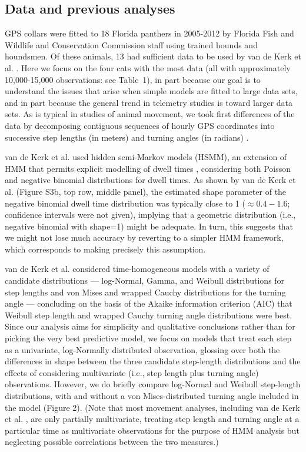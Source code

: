 \documentclass{bmcart}
\begin{document}
\subsection*{Data and previous analyses}


GPS collars were fitted to 18 Florida panthers in 2005-2012 by Florida
Fish and Wildlife and Conservation Commission staff using
trained hounds and houndsmen. Of these animals, 13 had 
sufficient data to be used by van de Kerk et al. \cite{kerk2015hidden}.
Here we focus on the four cats with the most data (all with approximately 10,000-15,000
observations: see Table~1), 
in part because our goal is to understand
the issues that arise when simple models are fitted to large data sets, and 
in part because the general trend in telemetry studies is toward larger data sets.  
As is typical in studies of animal movement, 
we took first differences of the data by decomposing
contiguous sequences of hourly GPS coordinates into 
successive step lengths (in meters) and turning angles (in radians)
\cite{turchin1998quantitative,kerk2015hidden}.


van de Kerk et al. \cite{kerk2015hidden} used hidden semi-Markov models (HSMM), 
an extension of HMM that permits explicit modelling of dwell times 
\cite{langrock_flexible_2012}, considering both Poisson and
negative binomial distributions for dwell times.  As shown 
by van de Kerk et al. \cite{kerk2015hidden} (Figure S3b, top row, middle panel),
the estimated shape parameter of the negative binomial dwell time
distribution was typically close to 1 ($\approx 0.4-1.6$; confidence
intervals were not given), implying that a geometric distribution
(i.e., negative binomial with shape=1) might be adequate. In turn,
this suggests that we might not lose much accuracy by reverting to 
a simpler HMM framework, which corresponds
to making precisely this assumption.


van de Kerk et al. \cite{kerk2015hidden} considered time-homogeneous models with 
a variety of candidate distributions %
--- log-Normal, Gamma, and Weibull distributions for step lengths
and von Mises and wrapped Cauchy distributions for the turning angle --- %
concluding on the basis of the Akaike information criterion (AIC) 
that Weibull step length and wrapped Cauchy turning angle distributions
were best.  
Since our analysis aims for simplicity and qualitative
conclusions rather than for picking the very best
predictive model, we focus on models that treat each step as
a univariate, log-Normally distributed observation, glossing
over both the differences in shape between
the three candidate step-length distributions and the effects
of considering multivariate (i.e., step length plus turning angle)
observations.  However, we do briefly compare log-Normal and Weibull
step-length distributions, with and without 
a von Mises-distributed turning angle included in the model (Figure 2).
(Note that most movement analyses, including van de Kerk et al.
\cite{kerk2015hidden}, are only partially multivariate, 
treating step length and turning angle at a particular time
as multivariate observations for the purpose of HMM
analysis but neglecting possible correlations
between the two measures.) 
\end{document}
